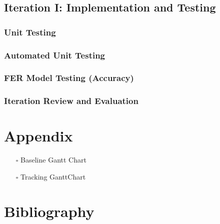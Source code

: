 \documentclass[12pt,a4paper,man]{report}
\begin{document}
\chapter{Iteration I: Implementation and Testing}
\label{sec:org780df73}

\section{Unit Testing}
\label{sec:org310a676}

\section{Automated Unit Testing}
\label{sec:org6e7836d}

\section{FER Model Testing (Accuracy)}
\label{sec:org1305c96}

\section{Iteration Review and Evaluation}
\label{sec:org65908a4}

\part{Appendix}
\label{sec:org5b2499b}
\begin{itemize}
\item[{$\square$}] Baseline Gantt Chart
\item[{$\square$}] Tracking GanttChart
\end{itemize}
\part{Bibliography}
\label{sec:org29eaef0}

\printglossaries



\end{document}
